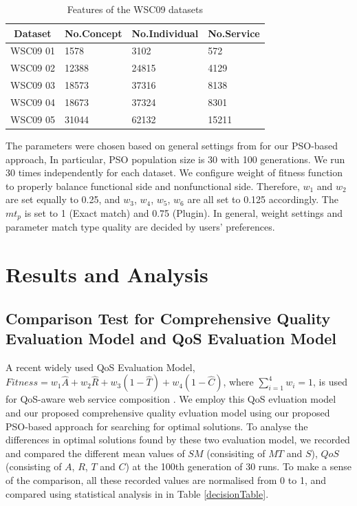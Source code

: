 \documentclass{llncs}
\begin{document}
\begin{table}[]
\centering
\caption{Features of the WSC09 datasets}
\label{wsc09datasetTable}
\begin{tabular}{l|l|l|l}
\hline
\multicolumn{1}{c|}{Dataset} & No.Concept & No.Individual & No.Service \\ \hline
WSC09 01                     & 1578       &3102           &572      \\ \hline
WSC09 02                     & 12388      &24815          &4129      \\ \hline
WSC09 03                     & 18573      &37316          &8138      \\ \hline
WSC09 04                     & 18673      &37324          &8301      \\ \hline
WSC09 05                     & 31044      &62132          &15211    \\ \hline
\end{tabular}
\end{table}

The parameters were chosen based on general settings from \cite{shi2001particle} for our PSO-based approach, In particular, PSO population size is 30 with 100 generations. We run 30 times independently for each dataset. We configure weight of fitness function to properly balance functional side and nonfunctional side. Therefore, $w_{1}$ and $w_{2}$ are set equally to 0.25, and $w_{3}$, $w_{4}$, $w_{5}$, $w_{6}$ are all set to 0.125 accordingly. The $mt_{p}$ is set to 1 (Exact match) and 0.75 (Plugin). In general, weight settings and parameter match type quality are decided by users' preferences.


\section{Results and Analysis}\label{results_analysis}
\subsection{Comparison Test for Comprehensive Quality Evaluation Model and QoS Evaluation Model}\label{comparisonTest}

A recent widely used QoS Evaluation Model, $Fitness = w_1 \hat{A} + w_2 \hat{R} + w_3(1 - \hat{T}) + w_4(1 - \hat{C})$, where $\sum_{i=1}^{4} w_i = 1$, is used for QoS-aware web service composition \cite{ma2015hybrid,da2016particle,da2015graphevol}. We employ this QoS evluation model and our proposed comprehensive quality evluation model using our proposed PSO-based approach for searching for optimal solutions.
To analyse the differences in optimal solutions found by these two evaluation model, we recorded and compared the different mean values of $SM$ (consisiting of $MT$ and $S$), $QoS$(consisting of $A$, $R$, $T$ and $C$) at the 100th generation of 30 runs. To make a sense of the comparison, all these recorded values are normalised from 0 to 1, and compared using statistical analysis in in Table \ref{decisionTable}. 
\end{document}
